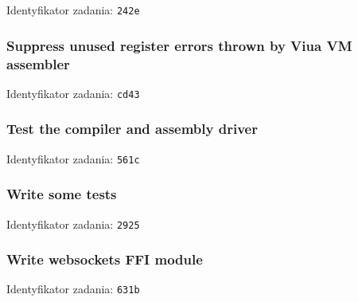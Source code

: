 Identyfikator zadania: \texttt{242e}

\subsubsection{Suppress unused register errors thrown by Viua VM assembler}

Identyfikator zadania: \texttt{cd43}

\subsubsection{Test the compiler and assembly driver}

Identyfikator zadania: \texttt{561c}

\subsubsection{Write some tests}

Identyfikator zadania: \texttt{2925}

\subsubsection{Write websockets FFI module}

Identyfikator zadania: \texttt{631b}
